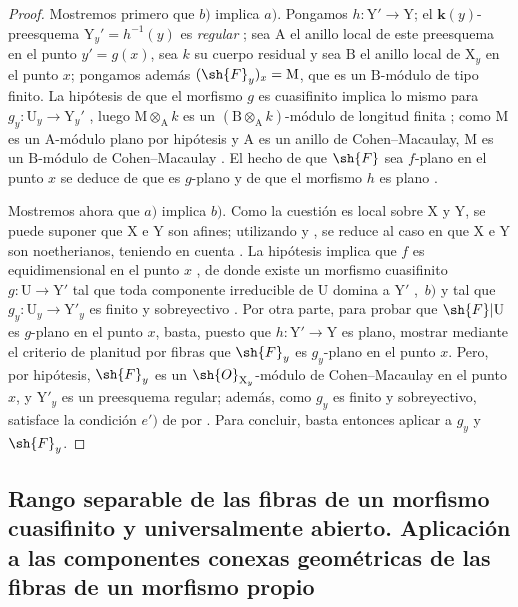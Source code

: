 \begin{proof}
\label{IV.15.4.3-proof}
Mostremos primero que $b)$ implica $a)$.
Pongamos $h:\mathrm{Y}'\to\mathrm{Y}$; el $\mathbf{k}(y)$-preesquema $\mathrm{Y}_y'=h^{-1}(y)$ es \emph{regular} ; sea $\mathrm{A}$ el anillo local de este preesquema en el punto $y'=g(x)$, sea $k$ su cuerpo residual y sea $\mathrm{B}$ el anillo local de $\mathrm{X}_y$ en el punto $x$; pongamos además $(\sh{F}_y)_x=\mathrm{M}$, que es un $\mathrm{B}$-módulo de tipo finito.
La hipótesis de que el morfismo $g$ es cuasifinito implica lo mismo para $g_y:\mathrm{U}_y\to\mathrm{Y}_y'$ , luego $\mathrm{M}\otimes_\mathrm{A} k$ es un $(\mathrm{B}\otimes_\mathrm{A} k)$-módulo de longitud finita ; como $\mathrm{M}$ es un $\mathrm{A}$-módulo plano por hipótesis y $\mathrm{A}$ es un anillo de Cohen--Macaulay, $\mathrm{M}$ es un $\mathrm{B}$-módulo de Cohen--Macaulay .
El hecho de que $\sh{F}$ sea $f$-plano en el punto $x$ se deduce de que es $g$-plano y de que el morfismo $h$ es plano .

Mostremos ahora que $a)$ implica $b)$.
Como la cuestión es local sobre $\mathrm{X}$ y $\mathrm{Y}$, se puede suponer que $\mathrm{X}$ e $\mathrm{Y}$ son afines; utilizando  y , se reduce al caso en que $\mathrm{X}$ e $\mathrm{Y}$ son noetherianos, teniendo en cuenta .
La hipótesis implica que $f$ es equidimensional en el punto $x$ , de donde existe un morfismo cuasifinito $g:\mathrm{U}\to\mathrm{Y}'$ tal que toda componente irreducible de $\mathrm{U}$ domina a $\mathrm{Y}'$ ,~$b)$ y tal que $g_y:\mathrm{U}_y\to\mathrm{Y}'_y$ es finito y sobreyectivo .
Por otra parte, para probar que $\sh{F}|\mathrm{U}$ es $g$-plano en el punto $x$, basta, puesto que $h:\mathrm{Y}'\to\mathrm{Y}$ es plano, mostrar mediante el criterio de planitud por fibras  que $\sh{F}_y$ es $g_y$-plano en el punto $x$.
Pero, por hipótesis, $\sh{F}_y$ es un $\sh{O}_{\mathrm{X}_y}$-módulo de Cohen--Macaulay en el punto $x$, y $\mathrm{Y}'_y$ es un preesquema regular; además, como $g_y$ es finito y sobreyectivo, satisface la condición $e')$ de  por .
Para concluir, basta entonces aplicar  a $g_y$ y $\sh{F}_y$.
\end{proof}
\subsection{Rango separable de las fibras de un morfismo cuasifinito y universalmente abierto. Aplicación a las componentes conexas geométricas de las fibras de un morfismo propio}
\label{subsection:IV.15.5}

